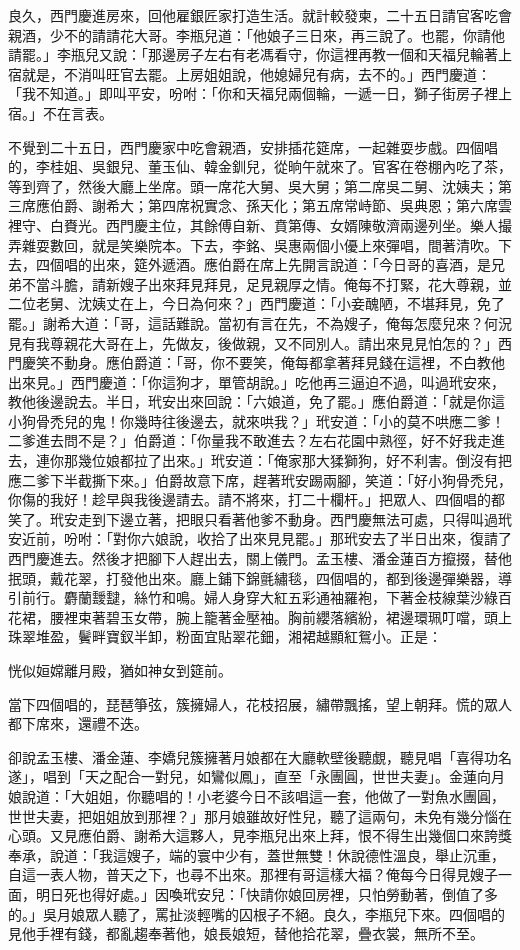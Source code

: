 良久，西門慶進房來，回他雇銀匠家打造生活。就計較發柬，二十五日請官客吃會親酒，少不的請請花大哥。李瓶兒道：「他娘子三日來，再三說了。也罷，你請他請罷。」李瓶兒又說：「那邊房子左右有老馮看守，你這裡再教一個和天福兒輪著上宿就是，不消叫旺官去罷。上房姐姐說，他媳婦兒有病，去不的。」西門慶道： 「我不知道。」即叫平安，吩咐：「你和天福兒兩個輪，一遞一日，獅子街房子裡上宿。」不在言表。

不覺到二十五日，西門慶家中吃會親酒，安排插花筵席，一起雜耍步戲。四個唱的，李桂姐、吳銀兒、董玉仙、韓金釧兒，從晌午就來了。官客在卷棚內吃了茶，等到齊了，然後大廳上坐席。頭一席花大舅、吳大舅；第二席吳二舅、沈姨夫；第三席應伯爵、謝希大；第四席祝實念、孫天化；第五席常峙節、吳典恩；第六席雲裡守、白賚光。西門慶主位，其餘傅自新、賁第傳、女婿陳敬濟兩邊列坐。樂人撮弄雜耍數回，就是笑樂院本。下去，李銘、吳惠兩個小優上來彈唱，間著清吹。下去，四個唱的出來，筵外遞酒。應伯爵在席上先開言說道：「今日哥的喜酒，是兄弟不當斗膽，請新嫂子出來拜見拜見，足見親厚之情。俺每不打緊，花大尊親，並二位老舅、沈姨丈在上，今日為何來？」西門慶道：「小妾醜陋，不堪拜見，免了罷。」謝希大道：「哥，這話難說。當初有言在先，不為嫂子，俺每怎麼兒來？何況見有我尊親花大哥在上，先做友，後做親，又不同別人。請出來見見怕怎的？」西門慶笑不動身。應伯爵道：「哥，你不要笑，俺每都拿著拜見錢在這裡，不白教他出來見。」西門慶道：「你這狗才，單管胡說。」吃他再三逼迫不過，叫過玳安來，教他後邊說去。半日，玳安出來回說：「六娘道，免了罷。」應伯爵道：「就是你這小狗骨禿兒的鬼！你幾時往後邊去，就來哄我？」玳安道：「小的莫不哄應二爹！二爹進去問不是？」伯爵道：「你量我不敢進去？左右花園中熟徑，好不好我走進去，連你那幾位娘都拉了出來。」玳安道：「俺家那大猱獅狗，好不利害。倒沒有把應二爹下半截撕下來。」伯爵故意下席，趕著玳安踢兩腳，笑道：「好小狗骨禿兒，你傷的我好！趁早與我後邊請去。請不將來，打二十欄杆。」把眾人、四個唱的都笑了。玳安走到下邊立著，把眼只看著他爹不動身。西門慶無法可處，只得叫過玳安近前，吩咐：「對你六娘說，收拾了出來見見罷。」那玳安去了半日出來，復請了西門慶進去。然後才把腳下人趕出去，關上儀門。孟玉樓、潘金蓮百方攛掇，替他抿頭，戴花翠，打發他出來。廳上鋪下錦氈繡毯，四個唱的，都到後邊彈樂器，導引前行。麝蘭靉靆，絲竹和鳴。婦人身穿大紅五彩通袖羅袍，下著金枝線葉沙綠百花裙，腰裡束著碧玉女帶，腕上籠著金壓袖。胸前纓落繽紛，裙邊環珮叮噹，頭上珠翠堆盈，鬢畔寶釵半卸，粉面宜貼翠花鈿，湘裙越顯紅鴛小。正是：

恍似姮嫦離月殿，猶如神女到筵前。

當下四個唱的，琵琶箏弦，簇擁婦人，花枝招展，繡帶飄搖，望上朝拜。慌的眾人都下席來，還禮不迭。

卻說孟玉樓、潘金蓮、李嬌兒簇擁著月娘都在大廳軟壁後聽覷，聽見唱「喜得功名遂」，唱到「天之配合一對兒，如鸞似鳳」，直至「永團圓，世世夫妻」。金蓮向月娘說道：「大姐姐，你聽唱的！小老婆今日不該唱這一套，他做了一對魚水團圓，世世夫妻，把姐姐放到那裡？」那月娘雖故好性兒，聽了這兩句，未免有幾分惱在心頭。又見應伯爵、謝希大這夥人，見李瓶兒出來上拜，恨不得生出幾個口來誇獎奉承，說道：「我這嫂子，端的寰中少有，蓋世無雙！休說德性溫良，舉止沉重，自這一表人物，普天之下，也尋不出來。那裡有哥這樣大福？俺每今日得見嫂子一面，明日死也得好處。」因喚玳安兒：「快請你娘回房裡，只怕勞動著，倒值了多的。」吳月娘眾人聽了，罵扯淡輕嘴的囚根子不絕。良久，李瓶兒下來。四個唱的見他手裡有錢，都亂趨奉著他，娘長娘短，替他拾花翠，疊衣裳，無所不至。

